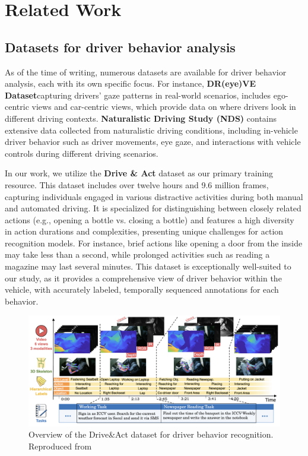 \chapter{Related Work}\label{chapter:relatedwork}

\section{Datasets for driver behavior analysis}

As of the time of writing, numerous datasets are available for driver behavior analysis, each with its own specific focus. For instance, \textbf{DR(eye)VE Dataset}\cite{palazzi2018predicting}capturing drivers' gaze patterns in real-world scenarios, includes ego-centric views and car-centric views, which provide data on where drivers look in different driving contexts. \textbf{Naturalistic Driving Study (NDS)}\cite{regan2012naturalistic} contains extensive data collected from naturalistic driving conditions, including in-vehicle driver behavior such as driver movements, eye gaze, and interactions with vehicle controls during different driving scenarios.


In our work, we utilize the \textbf{Drive \& Act} dataset\cite{9009583} as our primary training resource. This dataset includes over twelve hours and 9.6 million frames, capturing individuals engaged in various distractive activities during both manual and automated driving. It is specialized for distinguishing between closely related actions (e.g., opening a bottle vs. closing a bottle) and features a high diversity in action durations and complexities, presenting unique challenges for action recognition models. For instance, brief actions like opening a door from the inside may take less than a second, while prolonged activities such as reading a magazine may last several minutes. This dataset is exceptionally well-suited to our study, as it provides a comprehensive view of driver behavior within the vehicle, with accurately labeled, temporally sequenced annotations for each behavior.


\begin{figure}
    \centering
    \includegraphics[width=0.8\linewidth]{figures/03_DriveAct.png}
    \caption{Overview of the Drive\&Act dataset for driver behavior recognition. Reproduced from\cite{9009583}}
    \label{fig:DriveAct}
\end{figure}

